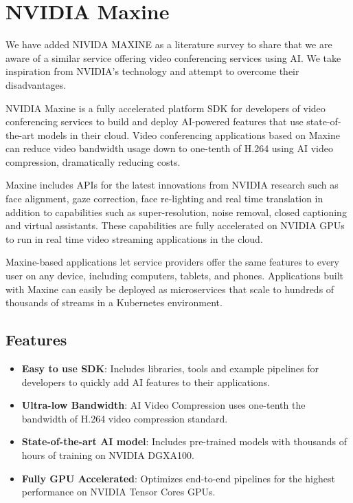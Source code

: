 \section{NVIDIA Maxine}

We have added NIVIDA MAXINE as a literature survey to share that we are aware of 
a similar service offering video conferencing services using AI. We take 
inspiration from NVIDIA's technology and attempt to overcome their disadvantages.

NVIDIA Maxine is a fully accelerated platform SDK for developers of video 
conferencing services to build and deploy AI-powered features that use state-of-the-art 
models in their cloud. Video conferencing applications based on Maxine can reduce video 
bandwidth usage down to one-tenth of H.264 using AI video compression, dramatically reducing costs.

Maxine includes APIs for the latest innovations from NVIDIA research such as face alignment, 
gaze correction, face re-lighting and real time translation in addition to capabilities such 
as super-resolution, noise removal, closed captioning and virtual assistants. These capabilities are 
fully accelerated on NVIDIA GPUs to run in real time video streaming applications in the cloud.

Maxine-based applications let service providers offer the same features to every user on any device,
including computers, tablets, and phones. Applications built with Maxine can easily be deployed as 
microservices that scale to hundreds of thousands of streams in a Kubernetes environment.~\cite{Maxine}

\subsection{Features}

\begin{itemize}
    \item \textbf{Easy to use SDK}: Includes libraries, tools and example pipelines 
    for developers to quickly add AI features to their applications.
    \item \textbf{Ultra-low Bandwidth}: AI Video Compression uses one-tenth the 
    bandwidth of H.264 video compression standard.
    \item \textbf{State-of-the-art AI model}: Includes pre-trained models with thousands of hours 
    of training on NVIDIA DGX\texttrademark A100.
    \item \textbf{Fully GPU Accelerated}: Optimizes end-to-end pipelines for the highest performance 
    on NVIDIA Tensor Cores GPUs.
\end{itemize}

